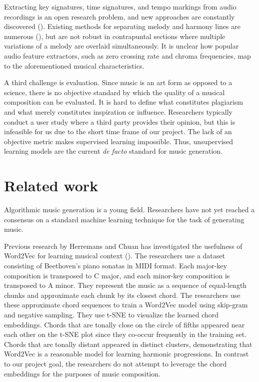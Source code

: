 \documentclass{article}
\begin{document}
Extracting key signatures, time signatures, and tempo markings from audio recordings is an open research problem, and new approaches are constantly discovered (\cite{end-to-end_musical_key_estimation}). Existing methods for separating melody and harmony lines are numerous (\cite{a_survey_of_melody}), but are not robust in contrapuntal sections where multiple variations of a melody are overlaid simultaneously. It is unclear how popular audio feature extractors, such as zero crossing rate and chroma frequencies, map to the aforementioned musical characteristics.

A third challenge is evaluation. Since music is an art form as opposed to a science, there is no objective standard by which the quality of a musical composition can be evaluated. It is hard to define what constitutes plagiarism and what merely constitutes inspiration or influence. Researchers typically conduct a user study where a third party provides their opinion, but this is infeasible for us due to the short time frame of our project. The lack of an objective metric makes supervised learning impossible. Thus, unsupervised learning models are the current \textit{de facto} standard for music generation.

\section{Related work}

Algorithmic music generation is a young field. Researchers have not yet reached a consensus on a standard machine learning technique for the task of generating music.

Previous research by Herremans and Chuan has investigated the usefulness of Word2Vec for learning musical context (\cite{modeling_musical_context_with}). The researchers use a dataset consisting of Beethoven's piano sonatas in MIDI format. Each major-key composition is transposed to C major, and each minor-key composition is transposed to A minor. They represent the music as a sequence of equal-length chunks and approximate each chunk by its closest chord. The researchers use these approximate chord sequences to train a Word2Vec model using skip-gram and negative sampling. They use t-SNE to visualize the learned chord embeddings. Chords that are tonally close on the circle of fifths appeared near each other on the t-SNE plot since they co-occur frequently in the training set. Chords that are tonally distant appeared in distinct clusters, demonstrating that Word2Vec is a reasonable model for learning harmonic progressions. In contrast to our project goal, the researchers do not attempt to leverage the chord embeddings for the purposes of music composition.
\end{document}
